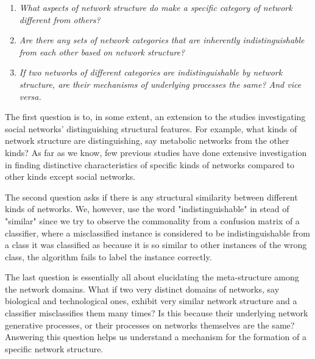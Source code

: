 \documentclass[..]{revtex4}
\begin{document}
\begin{enumerate}
	\item \textit{What aspects of network structure do make a specific category of network different from others?}
	\item \textit{Are there any sets of network categories that are inherently indistinguishable from each other based on network structure?} 
	\item \textit{If two networks of different categories are indistinguishable by network structure, are their mechanisms of underlying processes the same? And vice versa.}
\end{enumerate}

The first question is to, in some extent, an extension to the studies investigating social networks' distinguishing structural features. For example, what kinds of network structure are distinguishing, say metabolic networks from the other kinds? As far as we know, few previous studies have done extensive investigation in finding distinctive characteristics of specific kinds of networks compared to other kinds except social networks.

The second question asks if there is any structural similarity between different kinds of networks. We, however, use the word "indistinguishable" in stead of "similar" since we try to observe the commonality from a confusion matrix of a classifier, where a misclassified instance is considered to be indistinguishable from a class it was classified as because it is so similar to other instances of the wrong class, the algorithm fails to label the instance correctly.


The last question is essentially all about elucidating the meta-structure among the network domains. What if two very distinct domains of networks, say biological and technological ones, exhibit very similar network structure and a classifier misclassifies them many times? Is this because their underlying network generative processes, or their processes on networks themselves are the same? Answering this question helps us understand a mechanism for the formation of a specific network structure.
\end{document}
